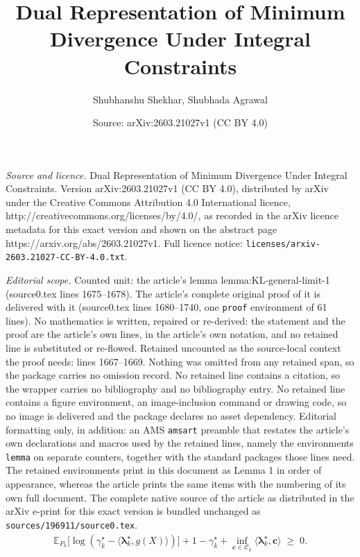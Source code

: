 \documentclass[10pt,a4paper]{amsart}
\title{Dual Representation of Minimum Divergence Under Integral Constraints}
\author{Shubhanshu Shekhar, Shubhada Agrawal}
\date{Source: arXiv:2603.21027v1 (CC BY 4.0)}
\newcommand{\boldlambda}{\boldsymbol{\lambda}}
\newcommand{\calC}{\mathcal C}
\newcommand{\cvec}{\mathbf{c}}
\begin{document}
\maketitle

\noindent\emph{Source and licence.} Dual Representation of Minimum Divergence Under Integral Constraints. Version arXiv:2603.21027v1 (CC BY 4.0), distributed by arXiv under the Creative Commons Attribution 4.0 International licence, http://creativecommons.org/licenses/by/4.0/, as recorded in the arXiv licence metadata for this exact version and shown on the abstract page https://arxiv.org/abs/2603.21027v1. Full licence notice: \texttt{licenses/arxiv-2603.21027-CC-BY-4.0.txt}.\par\smallskip

\noindent\textit{Editorial scope.} Counted unit: the article's lemma lemma:KL-general-limit-1 (source0.tex lines 1675--1678). The article's complete original proof of it is delivered with it (source0.tex lines 1680--1740, one \texttt{proof} environment of 61 lines). No mathematics is written, repaired or re-derived: the statement and the proof are the article's own lines, in the article's own notation, and no retained line is substituted or re-flowed.  Retained uncounted as the source-local context the proof needs: lines 1667--1669.  Nothing was omitted from any retained span, so the package carries no omission record.  No retained line contains a citation, so the wrapper carries no bibliography and no bibliography entry.  No retained line contains a figure environment, an image-inclusion command or drawing code, so no image is delivered and the package declares no asset dependency.  Editorial formatting only, in addition: an AMS \texttt{amsart} preamble that restates the article's own declarations and macros used by the retained lines, namely the environments \texttt{lemma} on separate counters, together with the standard packages those lines need.  The retained environments print in this document as Lemma 1 in order of appearance, whereas the article prints the same items with the numbering of its own full document.  The complete native source of the article as distributed in the arXiv e-print for this exact version is bundled unchanged as \texttt{sources/196911/source0.tex}.
\begin{align}
\mathbb E_{P_k}\big[\log(\gamma_k^\star-\langle\boldlambda_k^\star,g(X)\rangle)\big] +1-\gamma_k^\star +\inf_{\cvec\in \calC_k}\langle \boldlambda_k^\star,\cvec \rangle \;\ge\;0. \label{eq:opt-nonneg}
\end{align}
\end{document}
